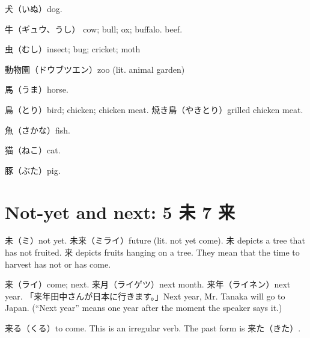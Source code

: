 犬（いぬ）dog.

牛（ギュウ、うし）
cow; bull; ox; buffalo.
beef.

虫（むし）insect; bug; cricket; moth

動物園（ドウブツエン）zoo (lit. animal garden)

馬（うま）horse.

鳥（とり）bird; chicken; chicken meat.
焼き鳥（やきとり）grilled chicken meat.

魚（さかな）fish.

猫（ねこ）cat.

豚（ぶた）pig.

\section{Not-yet and next: 5 未 7 来}

未（ミ）not yet.
未来（ミライ）future (lit. not yet come).
未 depicts a tree that has not fruited.
来 depicts fruits hanging on a tree.
They mean that the time to harvest has not or has come.

来（ライ）come; next.
来月（ライゲツ）next month.
来年（ライネン）next year.
「来年田中さんが日本に行きます。」Next year, Mr. Tanaka will go to Japan.
(``Next year'' means one year after the moment the speaker says it.)

来る（くる）to come.
This is an irregular verb.
The past form is 来た（きた）.
